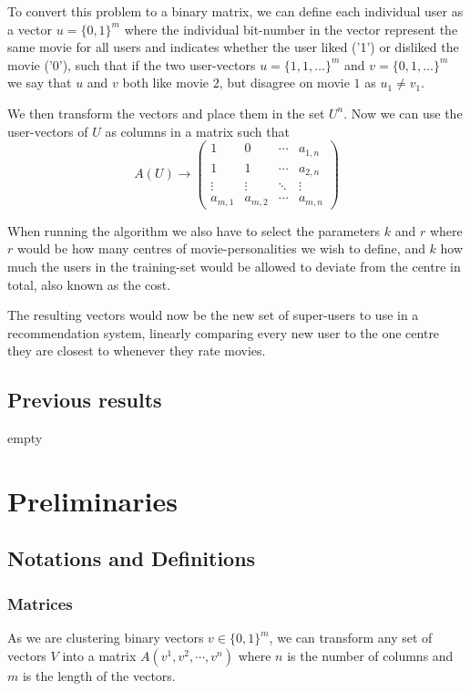 \documentclass[a4paper]{article}
\begin{document}
To convert this problem to a binary matrix, we can define each individual user as a vector
$u=\{0,1\}^m$ where the individual bit-number in the vector represent the same movie for all users
and indicates whether the user liked ('1') or disliked the movie ('0'), such that if the two
user-vectors $u=\{1,1,\ldots\}^m$ and $v=\{0,1,\ldots\}^m$ we say that $u$ and $v$ both like movie $2$,
but disagree on movie $1$ as $u_1 \neq v_1$.

We then transform the vectors and place them in the set $U^n$. Now we can use the user-vectors of $U$
as columns in a matrix such that
\[
    A(U)  \rightarrow \begin{pmatrix}
        1       & 0       & \cdots & a_{1,n} \\
        1       & 1       & \cdots & a_{2,n} \\
        \vdots  & \vdots  & \ddots & \vdots  \\
        a_{m,1} & a_{m,2} & \cdots & a_{m,n}
    \end{pmatrix}
\]

When running the algorithm we also have to select the parameters $k$ and $r$ where $r$ would be
how many centres of movie-personalities we wish to define, and $k$ how much the users in
the training-set would be allowed to deviate from the centre in total, also known as the cost.

The resulting vectors would now be the new set of super-users to use in a recommendation system,
linearly comparing every new user to the one centre they are closest to whenever they rate movies.

\subsection{Previous results}
empty

%
%
\newpage

\section{Preliminaries}
\subsection{Notations and Definitions}
\subsubsection{Matrices}
As we are clustering binary vectors $v \in \{0,1\}^m$, we can transform any set of vectors
$V$ into a matrix $A(v^1, v^2, \cdots, v^n)$ where $n$ is the number of columns
and $m$ is the length of the vectors.
\end{document}
